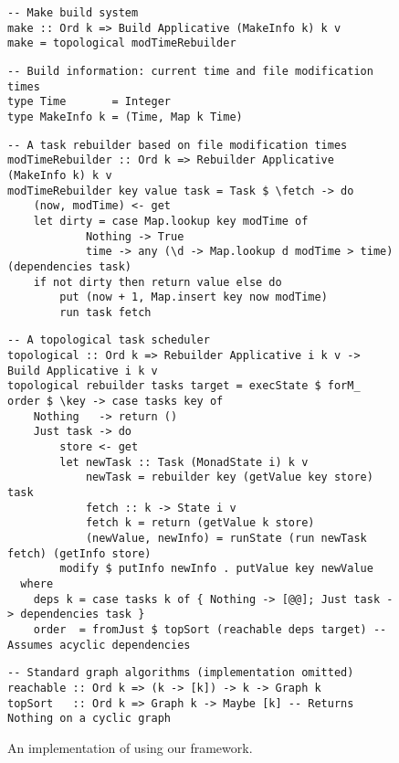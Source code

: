 \begin{figure}
\begin{verbatim}
-- Make build system
make :: Ord k => Build Applicative (MakeInfo k) k v
make = topological modTimeRebuilder
\end{verbatim}
\vspace{0mm}
\begin{verbatim}
-- Build information: current time and file modification times
type Time       = Integer
type MakeInfo k = (Time, Map k Time)
\end{verbatim}
\vspace{0mm}
\begin{verbatim}
-- A task rebuilder based on file modification times
modTimeRebuilder :: Ord k => Rebuilder Applicative (MakeInfo k) k v
modTimeRebuilder key value task = Task $ \fetch -> do
    (now, modTime) <- get
    let dirty = case Map.lookup key modTime of
            Nothing -> True
            time -> any (\d -> Map.lookup d modTime > time) (dependencies task)
    if not dirty then return value else do
        put (now + 1, Map.insert key now modTime)
        run task fetch
\end{verbatim}
\vspace{0mm}
\begin{verbatim}
-- A topological task scheduler
topological :: Ord k => Rebuilder Applicative i k v -> Build Applicative i k v
topological rebuilder tasks target = execState $ forM_ order $ \key -> case tasks key of
    Nothing   -> return ()
    Just task -> do
        store <- get
        let newTask :: Task (MonadState i) k v
            newTask = rebuilder key (getValue key store) task
            fetch :: k -> State i v
            fetch k = return (getValue k store)
            (newValue, newInfo) = runState (run newTask fetch) (getInfo store)
        modify $ putInfo newInfo . putValue key newValue
  where
    deps k = case tasks k of { Nothing -> [@@]; Just task -> dependencies task }
    order  = fromJust $ topSort (reachable deps target) -- Assumes acyclic dependencies
\end{verbatim}
\vspace{0mm}
\begin{verbatim}
-- Standard graph algorithms (implementation omitted)
reachable :: Ord k => (k -> [k]) -> k -> Graph k
topSort   :: Ord k => Graph k -> Maybe [k] -- Returns Nothing on a cyclic graph
\end{verbatim}
\vspace{-3mm}
\caption{An implementation of \Make using our framework.}\label{fig-make-implementation}
\vspace{-3mm}
\end{figure}


